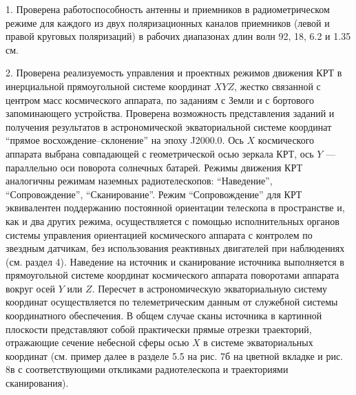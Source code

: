 1. Проверена работоспособность антенны и
приемников в радиометрическом режиме для каждого
из двух поляризационных каналов приемников (левой и правой круговых поляризаций)
в рабочих диапазонах длин волн 92, 18, 6.2 и 1.35 см.

2. Проверена реализуемость управления и проектных режимов движения КРТ в
инерциальной прямоугольной системе координат $XYZ$, жестко связанной с центром масс
космического аппарата, по заданиям с Земли и с бортового запоминающего
устройства. Проверена возможность представления заданий и получения
результатов в астрономической экваториальной системе координат
``прямое восхождение--склонение'' на эпоху J2000.0. Ось $X$
 космического
аппарата выбрана совпадающей с геометрической осью зеркала КРТ,
ось $Y$ --- параллельно оси поворота солнечных батарей.
Режимы движения КРТ аналогичны режимам наземных радиотелескопов:
``Наведение'', ``Сопровождение'', ``Сканирование''.
Режим ``Сопровождение'' для КРТ эквивалентен поддержанию постоянной ориентации
телескопа в пространстве и, как и два других режима, осуществляется
с помощью исполнительных органов системы управления ориентацией
космического аппарата с контролем по звездным датчикам,
без использования реактивных двигателей при наблюдениях (см. раздел 4).
Наведение на источник и сканирование источника выполняется в прямоугольной
системе координат космического аппарата поворотами аппарата вокруг осей $Y$ или $Z$.
Пересчет в астрономическую экваториальную систему координат
осуществляется по телеметрическим данным от служебной
системы координатного обеспечения.
В общем случае сканы источника в картинной плоскости представляют
собой практически прямые отрезки траекторий, отражающие сечение
небесной сферы осью $X$
в системе экваториальных координат
(см. пример далее в разделе 5.5 на рис.   7б на цветной вкладке и рис. 8в с соответствующими
откликами радиотелескопа и
траекториями сканирования).

